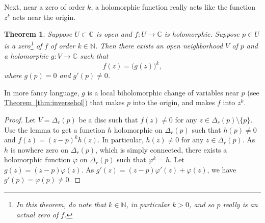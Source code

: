 \documentclass[12pt,openany]{book}
\newcommand{\C}{{\mathbb{C}}}
\newcommand{\N}{{\mathbb{N}}}
\theoremstyle{plain}
\newtheorem{thm}{Theorem}[section]
\theoremstyle{remark}
\theoremstyle{definition}
\theoremstyle{exercise}
\theoremstyle{example}
\newcommand{\thmref}[1]{\hyperref[#1]{Theorem~\ref*{#1}}}
\begin{document}
Next, near a zero of order $k$, a holomorphic function really acts like the
function $z^k$ acts near the origin.

\begin{thm}
Suppose $U \subset \C$ is open and $f \colon U \to \C$ is holomorphic.
Suppose $p \in U$ is a zero\footnote{In this theorem, do note
that $k \in \N$, in particular $k > 0$, and so $p$ really is an actual zero
of $f$.} of $f$ of order $k \in \N$.  Then there exists an open neighborhood $V$
of $p$ and a holomorphic $g \colon V \to \C$ such that
\begin{equation*}
f(z) = {\bigl( g(z) \bigr)}^k,
\end{equation*}
where $g(p) = 0$ and $g'(p) \not= 0$.
\end{thm}

In more fancy language, $g$ is a local biholomorphic change of variables near
$p$ (see \thmref{thm:inversehol})
that makes $p$ into the origin, and makes $f$ into $z^k$.

\begin{proof}
Let $V = \Delta_r(p)$ be a disc such that $f(z) \not= 0$ for any $z \in
\Delta_r(p) \setminus \{ p \}$.  Use the lemma to get a function $h$ holomorphic
on $\Delta_r(p)$ such that $h(p) \not= 0$ and $f(z) = {(z-p)}^k h(z)$.  In particular,
$h(z) \not= 0$ for any $z \in \Delta_r(p)$.
As $h$ is nowhere zero on $\Delta_r(p)$, which is simply connected,
there exists a holomorphic function $\varphi$ on $\Delta_r(p)$ such that
$\varphi^k = h$.  Let $g(z) = (z-p)\varphi(z)$.  As
$g'(z) = (z-p) \varphi'(z) + \varphi(z)$, we have $g'(p) = \varphi(p) \not= 0$.
\end{proof}
\end{document}
